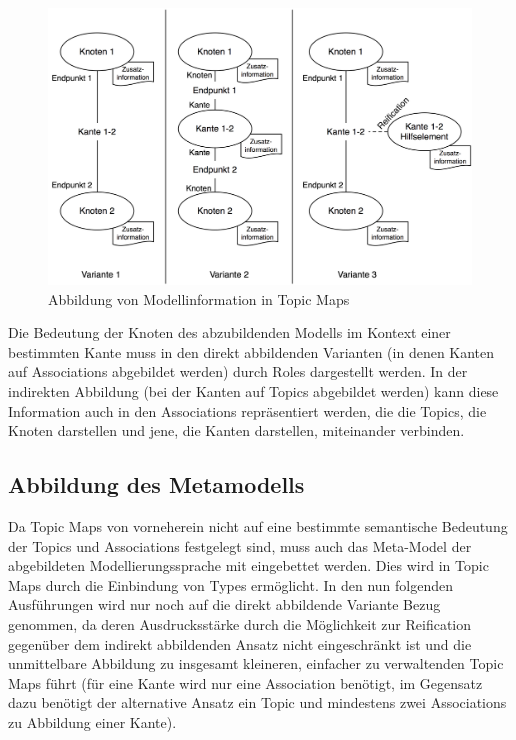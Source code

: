 \begin{figure}[htbp]
	\centering
		\includegraphics[width=13cm]{img/Persistenz/AssociationReification.png}
	\caption{Abbildung von Modellinformation in Topic Maps}
	\label{fig:img_Persistenz_AssociationReification}
\end{figure}

Die Bedeutung der Knoten des abzubildenden Modells im Kontext einer bestimmten Kante muss in den direkt abbildenden Varianten (in denen Kanten auf Associations abgebildet werden) durch Roles dargestellt werden. In der indirekten Abbildung (bei der Kanten auf Topics abgebildet werden) kann diese Information auch in den Associations repräsentiert werden, die die Topics, die Knoten darstellen und jene, die Kanten darstellen, miteinander verbinden.

\subsection{Abbildung des Metamodells}
\label{sub:abbildung_des_metamodells}
Da Topic Maps von vorneherein nicht auf eine bestimmte semantische Bedeutung der Topics und Associations festgelegt sind, muss auch das Meta-Model der abgebildeten Modellierungssprache mit eingebettet werden. Dies wird in Topic Maps durch die Einbindung von Types ermöglicht. In den nun folgenden Ausführungen wird nur noch auf die direkt abbildende Variante Bezug genommen, da deren Ausdrucksstärke durch die Möglichkeit zur Reification gegenüber dem indirekt abbildenden Ansatz nicht eingeschränkt ist und die unmittelbare Abbildung zu insgesamt kleineren, einfacher zu verwaltenden Topic Maps führt (für eine Kante wird nur eine Association benötigt, im Gegensatz dazu benötigt der alternative Ansatz ein Topic und mindestens zwei Associations zu Abbildung einer Kante).

